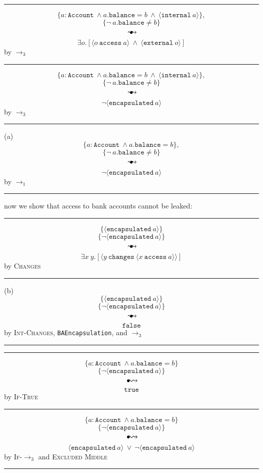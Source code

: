 \documentclass[12pt]{article}
\newcommand\trans{\mathlarger{\mathlarger \leadsto}}
\newcommand\oi{\hspace{1mm}{\raisebox{1pt}{$\bullet$}}\hspace{-1mm}{\trans}}
\newcommand\ot{\hspace{2mm}{\raisebox{1pt}{$\bullet$}}\hspace{-3mm}{\trans}}
\newcommand\encapsulated[1]{\langle \texttt{encapsulated}\ #1 \rangle}
\newcommand\changes[2]{\langle #1\ \texttt{changes}\ #2 \rangle}
\newcommand\access[2]{\langle #1\ \texttt{access}\ #2 \rangle}
\numberwithin{case}{lemma}
\numberwithin{case}{theorem}
\numberwithin{subcase}{case}
\begin{document}
\hrule
\vspace{3mm}
$$
	\{a : \texttt{Account}\ \wedge a.\texttt{balance} = b\ \wedge\  \langle \texttt{internal}\ a \rangle\},
$$
$$
	\{\neg\ a.\texttt{balance} \neq b\}
$$
$$\ot$$
$$
	{\exists o.[\langle o\ \texttt{access}\ a\rangle\ \wedge\ \langle \texttt{external}\ o \rangle]}
$$
\hfill by $\longrightarrow_3$
\hrule
\vspace{3mm}
$$
	\{a : \texttt{Account}\ \wedge a.\texttt{balance} = b\ \wedge\  \langle \texttt{internal}\ a \rangle\},
$$
$$
	\{\neg\ a.\texttt{balance} \neq b\}
$$
$$\ot$$
$$
	{\neg \encapsulated{a}}
$$
\hfill by $\longrightarrow_3$
\hrule
\vspace{3mm}
(a)
$$
	\{a : \texttt{Account}\ \wedge a.\texttt{balance} = b \},
$$
$$
	\{\neg\ a.\texttt{balance} \neq b\}
$$
$$\ot$$
$$
	{\neg \encapsulated{a}}
$$
\hfill by $\longrightarrow_1$
\hrule
\vspace{3mm}
\normalsize
\noindent now we show that access to bank accounts cannot be leaked:
\vspace{3mm}
\footnotesize
\hrule
\vspace{3mm}
$$
	\{\encapsulated{a}\}
$$
$$
	\{\neg\encapsulated{a}\}
$$
$$\ot$$
$$
	\exists x\ y.[\changes{y}{\access{x}{a}}]
$$
\hfill by \textsc{Changes}
\hrule
\vspace{3mm}
(b)
$$
	\{\encapsulated{a}\}
$$
$$
	\{\neg\encapsulated{a}\}
$$
$$\ot$$
$$
	\texttt{false}
$$
\hfill by \textsc{Int-Changes}, \texttt{BAEncapsulation}, and $\longrightarrow_3$ \\
\hrule
\vspace{3mm}
\vspace{3mm}
\hrule
\vspace{3mm}
$$
	\{a : \texttt{Account}\ \wedge a.\texttt{balance} = b\}
$$
$$
	\{\neg \encapsulated{a}\}
$$
$$\oi$$
$$
	{\texttt{true}}
$$
\hfill by \textsc{If-True}
\hrule
\vspace{3mm}
$$
	\{a : \texttt{Account}\ \wedge a.\texttt{balance} = b\}
$$
$$
	\{\neg \encapsulated{a}\}
$$
$$\oi$$
$$
	{\encapsulated{a}\ \vee\ \neg\encapsulated{a}}
$$
\hfill by \textsc{If-$\longrightarrow_3$} and \textsc{Excluded Middle}
\hrule
\vspace{3mm}
\end{document}
